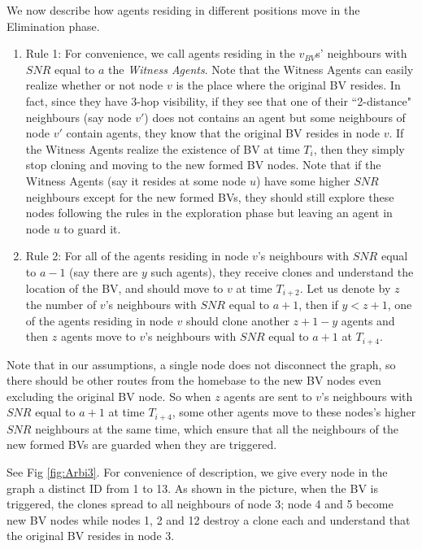 We now  describe how agents residing in different positions move in the Elimination phase.
\begin{enumerate}

\item Rule 1: For convenience, we call agents residing in the   $v_{BV}$s' neighbours with $SNR$ equal to $a$ the {\em Witness Agents}. Note that the  Witness Agents can easily realize whether or not node $v$ is the place where the original BV resides. In fact, since they have 3-hop visibility, if they see that one of their ``2-distance" neighbours (say node $v'$) does not contains an agent but some neighbours of node $v'$ contain agents, they   know that the original BV resides in node $v$. If the Witness Agents realize the existence of BV at time  $T_i$, then they simply stop cloning and moving to the new formed BV nodes. Note that if the Witness Agents (say it resides at some node $u$) have some higher $SNR$ neighbours except for the new formed BVs, they should still explore these nodes following the rules in the exploration phase but leaving an agent in node $u$ to guard it.  

\item Rule 2: For all of the agents residing in node $v$'s neighbours with $SNR$ equal to $a-1$ (say  there are $y$ such agents), they receive clones and understand the location of the BV,  and should move to $v$ at  time $T_{i+2}$. Let us denote by $z$ the number of $v$'s neighbours with $SNR$ equal to $a+1$, then if $y< z+1$, one of the agents residing in node $v$ should clone another $z+1-y$ agents and then $z$ agents move to $v$'s neighbours with $SNR$ equal to $a+1$ at $T_{i+4}$.
\end{enumerate}

Note that in our assumptions, a single node does not disconnect the graph,  so there should be other routes from the homebase to the new BV nodes even excluding   the original BV node. So when $z$ agents are sent to $v$'s neighbours with $SNR$ equal to $a+1$ at time $T_{i+4}$, some other agents move to these nodes's higher $SNR$ neighbours at the same time, which ensure that all the neighbours of the new formed BVs are guarded when they are triggered. 

See Fig \ref{fig:Arbi3}. For convenience of description, we give every node in the graph a distinct ID from 1 to 13. As shown in the picture, when the BV is triggered, the clones spread to all neighbours of node 3;  node 4 and 5 become new BV nodes while nodes 1, 2 and 12 destroy a clone each and understand  that the original BV resides in node 3. 

